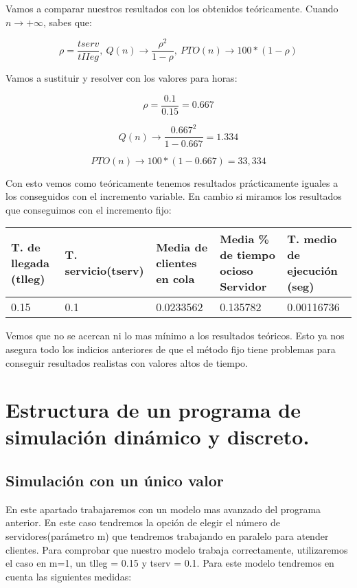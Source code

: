 \documentclass[]{article}
\begin{document}
Vamos a comparar nuestros resultados con los obtenidos teóricamente. Cuando $n \rightarrow+\infty$, sabes que:
 
$$\rho=\frac{ { tserv }}{ { tII eg }},\ Q(n) \rightarrow \frac{\rho^{2}}{1-\rho},\ P T O(n) \rightarrow 100 *(1-\rho)$$

Vamos a sustituir y resolver con los valores para horas:

$$\rho=\frac{ { 0.1 }}{ { 0.15 }} = 0.667 $$

$$Q(n) \rightarrow \frac{0.667^{2}}{1-0.667} = 1.334 $$

$$P T O(n) \rightarrow 100*(1-0.667) = 33,334$$

Con esto vemos como teóricamente tenemos resultados prácticamente iguales a los conseguidos con el incremento variable. En cambio si miramos los resultados que conseguimos con el incremento fijo:
\begin{table}[H]
	\begin{center}
		\begin{tabularx}{0.9\textwidth}{|X|X|X|X|X|}
			\hline
			\textbf{T. de llegada (tlleg)} & \textbf{T. servicio(tserv)}&\textbf{Media de clientes en cola} & \textbf{Media \% de tiempo ocioso Servidor} & \textbf{T. medio de ejecución (seg)} \\
			\hline \hline
			0.15 & 0.1 & 0.0233562 & 0.135782 &0.00116736\\ \hline
		\end{tabularx}
		
	\end{center}
\end{table}

Vemos que no se acercan ni lo mas mínimo a los resultados teóricos. Esto ya nos asegura todo los indicios anteriores de que el método fijo tiene problemas para conseguir resultados realistas con valores altos de tiempo.


\section{Estructura de un programa de simulación dinámico y discreto.}
\subsection{Simulación con un único valor}
En este apartado trabajaremos con un modelo mas avanzado del programa anterior. En este caso tendremos la opción de elegir el número de servidores(parámetro m) que tendremos trabajando en paralelo para atender clientes. Para comprobar que nuestro modelo trabaja correctamente, utilizaremos el caso en m=1, un tlleg = 0.15 y tserv = 0.1. Para este modelo tendremos en cuenta las siguientes medidas:
\end{document}
